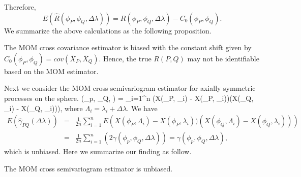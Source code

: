 Therefore,
			\[
				E(\hat{R}(\phi_P, \phi_Q, \Delta \lambda)) = R(\phi_P, \phi_Q, \Delta \lambda) - C_0 (\phi_P, \phi_Q).
			\]
We summarize the above calculations as the following proposition.
\begin{prop}
The MOM cross covariance estimator is biased with the constant shift given by $C_0(\phi_P, \phi_Q) = cov(\bar{X}_P, \bar{X}_Q)$. Hence, the true $R(P, Q)$ may not be identifiable based on the MOM estimator.  
\end{prop}
				

\vskip 16pt				

			
Next we consider the MOM cross semivariogram estimator for axially symmetric processes on the sphere.				
			\beq \label{cross_variogram}
			\hat{\gamma}(\phi_p, \phi_Q, \Delta\lambda) =  \sum_{i=1}^n \left(X(\phi_P, \Lambda_i) - X(\phi_P, \lambda_i))(X(\phi_Q, \Lambda_i) - X(\phi_Q, \lambda_i))\right),
			\eeq
where $\Lambda_i = \lambda_i+\Delta \lambda$. We have
			\begin{eqnarray*}
				E(\hat{\gamma}_{PQ}(\Delta \lambda)) &=& \frac{1}{2n} \sum_{i=1}^n E\left(X(\phi_P, \Lambda_i) - X(\phi_P, \lambda_i))(X(\phi_Q, \Lambda_i) - X(\phi_Q, \lambda_i))\right) \\
				&=& \frac{1}{2n} \sum_{i=1}^n \left( 2\gamma(\phi_p, \phi_Q, \Delta\lambda) \right) = \gamma(\phi_p, \phi_Q, \Delta\lambda),
			\end{eqnarray*}
			which is unbiased. Here we summarize our finding as follow.

\begin{prop}
The MOM cross semivariogram estimator is unbiased.
\end{prop}
				
				
%			
			
